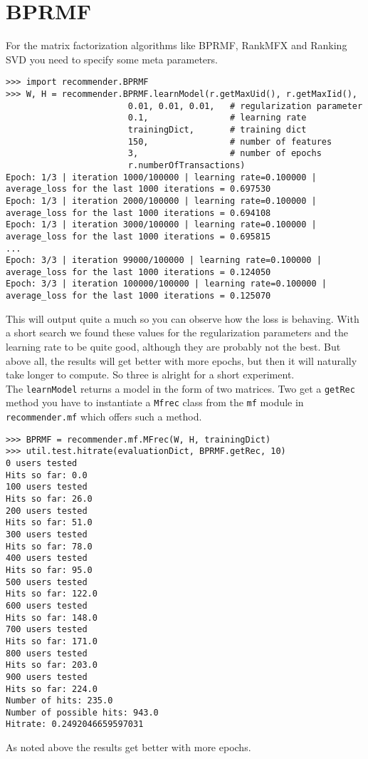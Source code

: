 \section{BPRMF}
For the matrix factorization algorithms like BPRMF, RankMFX
and Ranking SVD you need to specify some meta parameters.
\begin{lstlisting}[style=python]
>>> import recommender.BPRMF
>>> W, H = recommender.BPRMF.learnModel(r.getMaxUid(), r.getMaxIid(),
                        0.01, 0.01, 0.01,   # regularization parameter
                        0.1,                # learning rate
                        trainingDict,       # training dict
                        150,                # number of features
                        3,                  # number of epochs
                        r.numberOfTransactions)
Epoch: 1/3 | iteration 1000/100000 | learning rate=0.100000 | average_loss for the last 1000 iterations = 0.697530
Epoch: 1/3 | iteration 2000/100000 | learning rate=0.100000 | average_loss for the last 1000 iterations = 0.694108
Epoch: 1/3 | iteration 3000/100000 | learning rate=0.100000 | average_loss for the last 1000 iterations = 0.695815
...
Epoch: 3/3 | iteration 99000/100000 | learning rate=0.100000 | average_loss for the last 1000 iterations = 0.124050
Epoch: 3/3 | iteration 100000/100000 | learning rate=0.100000 | average_loss for the last 1000 iterations = 0.125070
\end{lstlisting}
This will output quite a much so you can observe how the loss is behaving.
With a short search we found these values for the regularization parameters
and the learning rate to be quite good, although they are probably not the
best. But above all, the results will get better with more epochs, but then
it will naturally take longer to compute. So three is alright for a short
experiment.\\
The \lstinline!learnModel! returns a model in the form of two matrices. Two get a 
\lstinline!getRec! method you have to instantiate a \lstinline!Mfrec! class from the \lstinline!mf! module
in \lstinline!recommender.mf! which offers such a method.
\begin{lstlisting}[style=python]
>>> BPRMF = recommender.mf.MFrec(W, H, trainingDict)
>>> util.test.hitrate(evaluationDict, BPRMF.getRec, 10)
0 users tested
Hits so far: 0.0
100 users tested
Hits so far: 26.0
200 users tested
Hits so far: 51.0
300 users tested
Hits so far: 78.0
400 users tested
Hits so far: 95.0
500 users tested
Hits so far: 122.0
600 users tested
Hits so far: 148.0
700 users tested
Hits so far: 171.0
800 users tested
Hits so far: 203.0
900 users tested
Hits so far: 224.0
Number of hits: 235.0
Number of possible hits: 943.0
Hitrate: 0.2492046659597031
\end{lstlisting}
As noted above the results get better with more epochs.
